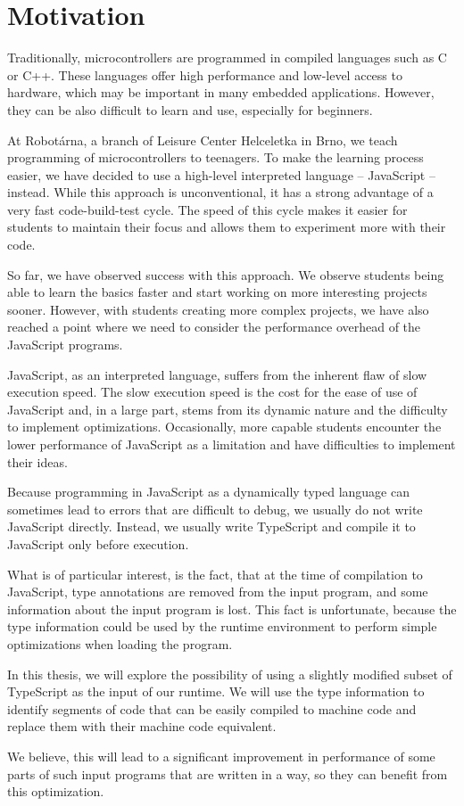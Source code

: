 \chapter{Motivation}

Traditionally, microcontrollers are programmed in compiled languages such as C or C++. These languages offer high performance and low-level access to hardware, which may be important in many embedded applications. However, they can be also difficult to learn and use, especially for beginners.

At Robotárna, a branch of Leisure Center Helceletka in Brno, we teach programming of microcontrollers to teenagers. To make the learning process easier, we have decided to use a high-level interpreted language -- JavaScript -- instead. While this approach is unconventional, it has a strong advantage of a very fast code-build-test cycle. The speed of this cycle makes it easier for students to maintain their focus and allows them to experiment more with their code.

So far, we have observed success with this approach. We observe students being able to learn the basics faster and start working on more interesting projects sooner. However, with students creating more complex projects, we have also reached a point where we need to consider the performance overhead of the JavaScript programs.

JavaScript, as an interpreted language, suffers from the inherent flaw of slow execution speed. The slow execution speed is the cost for the ease of use of JavaScript and, in a large part, stems from its dynamic nature and the difficulty to implement optimizations. Occasionally, more capable students encounter the lower performance of JavaScript as a limitation and have difficulties to implement their ideas.

Because programming in JavaScript as a dynamically typed language can sometimes lead to errors that are difficult to debug, we usually do not write JavaScript directly. Instead, we usually write TypeScript and compile it to JavaScript only before execution.

What is of particular interest, is the fact, that at the time of compilation to JavaScript, type annotations are removed from the input program, and some information about the input program is lost. This fact is unfortunate, because the type information could be used by the runtime environment to perform simple optimizations when loading the program.

In this thesis, we will explore the possibility of using a slightly modified subset of TypeScript as the input of our runtime. We will use the type information to identify segments of code that can be easily compiled to machine code and replace them with their machine code equivalent.


We believe, this will lead to a significant improvement in performance of some parts of such input programs that are written in a way, so they can benefit from this optimization.

